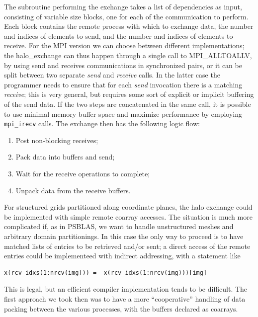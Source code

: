 \documentclass{IOS-Book-Article}
\begin{document}
The subroutine performing the exchange takes a list of dependencies as
input, consisting  of variable size blocks, one for each of the
communication to perform. Each  block contains the remote process with
which to  exchange data, the number and indices of elements to send,
and the number and indices of elements to receive.
For the MPI version we can choose between different implementations; 
the halo\_exchange can thus happen through a single call to
MPI\_ALLTOALLV, by using send and receives communications in
synchronized pairs, or it can be split between 
two separate \emph{send} and \emph{receive} calls. In the latter case
the programmer needs to ensure that for each \emph{send} invocation
there is a matching \emph{receive}; this is very general, but requires
some sort of explicit or implicit buffering of the send data. 
If the two steps are concatenated in the same call, it is possible to
use minimal memory buffer space and maximize performance by employing 
\verb|mpi_irecv| calls.
The exchange then has the following logic flow: 
\begin{enumerate}
  \item Post non-blocking receives;
  \item Pack data into buffers and send; 
  \item Wait for the receive operations to complete; 
  \item Unpack data from the receive buffers. 
\end{enumerate} 
For structured grids partitioned along coordinate planes, the halo
exchange could be implemented with simple remote coarray accesses. The
situation is much more complicated if, as in PSBLAS, we want to handle
unstructured meshes and arbitrary domain partitionings. In this  case
the only way to proceed is to have matched lists of entries to be
retrieved and/or sent; a direct access of the remote entries could be
implementeed with indirect addressing, with a statement like
\lstset{language=Fortran} 
{\small
\begin{lstlisting}
x(rcv_idxs(1:nrcv(img))) =  x(rcv_idxs(1:nrcv(img)))[img]
\end{lstlisting}}
This is  legal, but an efficient  compiler implementation tends to be
difficult.  The first approach we took then was to 
have a more ``cooperative'' handling of data packing between the
various processes, with the buffers declared as coarrays. 
\end{document}
